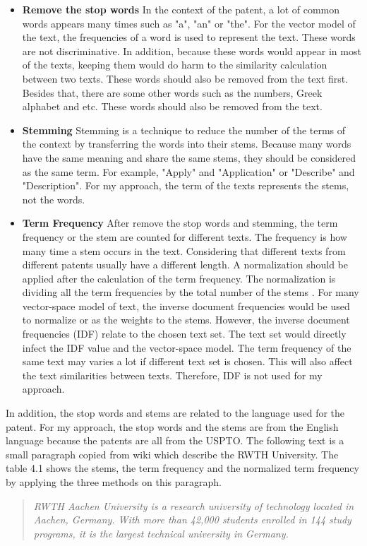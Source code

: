 \begin{itemize}
\item  \textbf{Remove the stop words} In the context of the patent, a lot of common words appears many times such as "a", "an" or "the". For the vector model of the text, the frequencies of a word is used to represent the text. These words are not discriminative. In addition, because these words would appear in most of the texts, keeping them would do harm to the similarity calculation between two texts. These words should also be removed from the text first. Besides that, there are some other words such as the numbers, Greek alphabet and etc. These words should also be removed from the text.
 
\item  \textbf{Stemming} Stemming is a technique to reduce the number of the terms of the context by transferring the words into their stems. Because many words have the same meaning and share the same stems, they should be considered as the same term. For example, "Apply" and "Application" or "Describe" and "Description". For my approach, the term of the texts represents the stems, not the words. 
 
\item  \textbf{Term Frequency} After remove the stop words and stemming, the term frequency or the stem are counted for different texts. The frequency is how many time a stem occurs in the text. Considering that different texts from different patents usually have a different length. A normalization should be applied after the calculation of the term frequency. The normalization is dividing all the term frequencies by the total number of the stems . For many vector-space model of text, the inverse document frequencies would be used to normalize or as the weights to the stems. However, the inverse document frequencies (IDF) relate to the chosen text set. The text set would directly infect the IDF value and the vector-space model. The term frequency of the same text may varies a lot if different text set is chosen.  This will also affect the text similarities between texts. Therefore, IDF is not used for my approach.
\end{itemize}

In addition, the stop words and stems are related to the language used for the patent. For my approach, the stop words and the stems are from the English language because the patents are all from the USPTO. The following text is a small paragraph copied from wiki which describe the RWTH University. The table 4.1 shows the stems, the term frequency and the normalized term frequency by applying the three methods on this paragraph.
\begin{quotation}
\emph{RWTH Aachen University is a research university of technology located in Aachen, Germany. With more than 42,000 students enrolled in 144 study programs, it is the largest technical university in Germany.}
\end{quotation}

